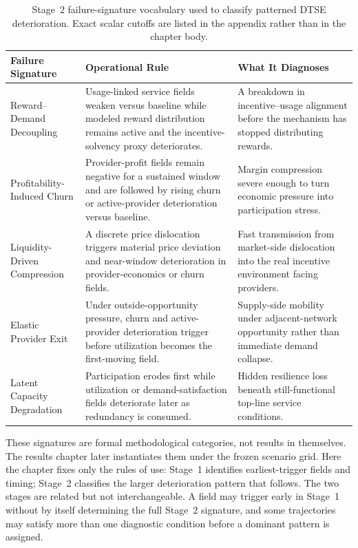 \begin{table}[tbp]
    \centering
    \footnotesize
    \renewcommand{\arraystretch}{1.2}
    \begin{tabularx}{\textwidth}{@{}>{\raggedright\arraybackslash}p{}>{\raggedright\arraybackslash}p{}X@{}}
        \toprule
        \textbf{Failure Signature} & \textbf{Operational Rule} & \textbf{What It Diagnoses} \\
        \midrule
        Reward--Demand Decoupling & Usage-linked service fields weaken versus baseline while modeled reward distribution remains active and the incentive-solvency proxy deteriorates. & A breakdown in incentive--usage alignment before the mechanism has stopped distributing rewards. \\
        \addlinespace
        Profitability-Induced Churn & Provider-profit fields remain negative for a sustained window and are followed by rising churn or active-provider deterioration versus baseline. & Margin compression severe enough to turn economic pressure into participation stress. \\
        \addlinespace
        Liquidity-Driven Compression & A discrete price dislocation triggers material price deviation and near-window deterioration in provider-economics or churn fields. & Fast transmission from market-side dislocation into the real incentive environment facing providers. \\
        \addlinespace
        Elastic Provider Exit & Under outside-opportunity pressure, churn and active-provider deterioration trigger before utilization becomes the first-moving field. & Supply-side mobility under adjacent-network opportunity rather than immediate demand collapse. \\
        \addlinespace
        Latent Capacity Degradation & Participation erodes first while utilization or demand-satisfaction fields deteriorate later as redundancy is consumed. & Hidden resilience loss beneath still-functional top-line service conditions. \\
        \bottomrule
    \end{tabularx}
    \caption[Stage 2 failure-signature logic]{Stage~2 failure-signature vocabulary used to classify patterned DTSE deterioration. Exact scalar cutoffs are listed in the appendix rather than in the chapter body.}
    \label{tab:dtse_failure_signature_logic}
\end{table}

These signatures are formal methodological categories, not results in themselves. The results chapter later instantiates them under the frozen scenario grid. Here the chapter fixes only the rules of use: Stage~1 identifies earliest-trigger fields and timing; Stage~2 classifies the larger deterioration pattern that follows. The two stages are related but not interchangeable. A field may trigger early in Stage~1 without by itself determining the full Stage~2 signature, and some trajectories may satisfy more than one diagnostic condition before a dominant pattern is assigned.

